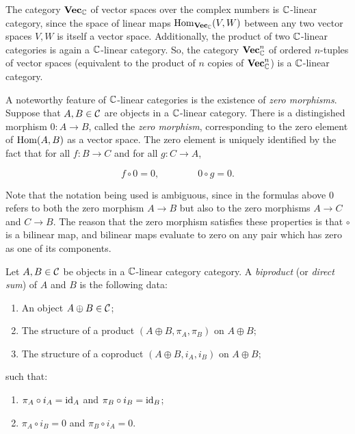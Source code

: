 \begin{ex}\label{linear-category-examples} The category ${\bf Vec}_{{\mathbb C}}$ of vector spaces over the complex numbers is  ${\mathbb C}$-linear category, since the space of linear maps $\operatorname{Hom}_{{\bf Vec}_{{\mathbb C}}}(V,W)$ between any two vector spaces $V,W$ is itself a vector space. Additionally, the product of two ${\mathbb C}$-linear categories is again a ${\mathbb C}$-linear category. So, the category ${\bf Vec}_{{\mathbb C}}^n$ of ordered $n$-tuples of vector spaces (equivalent to the product of $n$ copies of ${\bf Vec}_{{\mathbb C}}^n$) is a ${\mathbb C}$-linear category.
\end{ex}

\begin{rem} A noteworthy feature of ${\mathbb C}$-linear categories is the existence of {\em zero morphisms}. Suppose that $A,B\in {\mathcal C}$ are objects in a ${\mathbb C}$-linear category. There is a distingished morphism $0:A\to B$, called the {\em zero morphism}, corresponding to the zero element of $\operatorname{Hom}(A,B)$ as a vector space. The zero element is uniquely identified by the fact that for all $f:B\to C$ and for all $g:C\to A$,

$$ f\circ 0=0, \qquad\qquad 0\circ g=0.$$

Note that the notation being used is ambiguous, since in the formulas above $0$ refers to both the zero morphism $A\to B$ but also to the zero morphisms $A\to C$ and $C\to B$. The reason that the zero morphism satisfies these properties is that $\circ$ is a bilinear map, and bilinear maps evaluate to zero on any pair which has zero as one of its components.
\end{rem}

\begin{defn}[Biproduct]\label{biproduct-definition} Let $A,B\in {\mathcal C}$ be objects in a ${\mathbb C}$-linear category category. A {\em biproduct} (or {\em direct sum}) of $A$ and $B$ is the following data:

\begin{enumerate}
\item An object $A\oplus B\in {\mathcal C}$;
\item The structure of a product $(A\oplus B,\pi_A,\pi_B)$ on $A\oplus B$;
\item The structure of a coproduct $(A\oplus B,i_A,i_B)$ on $A\oplus B$;
\end{enumerate}

such that:

\begin{enumerate}
\item $\pi_A\circ i_A=\operatorname{id}_A$ and $\pi_B\circ i_B=\operatorname{id}_B$;
\item $\pi_A\circ i_B=0$ and $\pi_B\circ i_A=0$.
\end{enumerate}
\end{defn}

